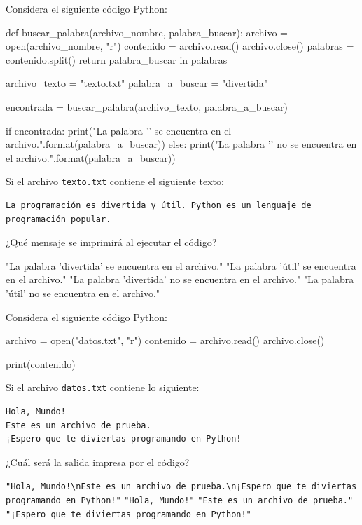 \begin{ejercicio}
Considera el siguiente código Python:

\begin{python}
def buscar_palabra(archivo_nombre, palabra_buscar):
    archivo = open(archivo_nombre, "r")
    contenido = archivo.read()
    archivo.close()
    palabras = contenido.split()
    return palabra_buscar in palabras

archivo_texto = "texto.txt"
palabra_a_buscar = "divertida"

encontrada = buscar_palabra(archivo_texto, palabra_a_buscar)

if encontrada:
    print("La palabra '{}' se encuentra en el archivo.".format(palabra_a_buscar))
else:
    print("La palabra '{}' no se encuentra en el archivo.".format(palabra_a_buscar))
\end{python}

Si el archivo \texttt{texto.txt} contiene el siguiente texto:\\

\begin{Verbatim}[frame=single]
La programación es divertida y útil. Python es un lenguaje de programación popular.
\end{Verbatim}

¿Qué mensaje se imprimirá al ejecutar el código?

\begin{choices}
    \choice "La palabra 'divertida' se encuentra en el archivo."
    \choice "La palabra 'útil' se encuentra en el archivo."
    \choice "La palabra 'divertida' no se encuentra en el archivo."
    \choice "La palabra 'útil' no se encuentra en el archivo."
\end{choices}

\end{ejercicio}

\begin{ejercicio}
Considera el siguiente código Python:

\begin{python}
archivo = open("datos.txt", "r")
contenido = archivo.read()
archivo.close()

print(contenido)
\end{python}

Si el archivo \texttt{datos.txt} contiene lo siguiente:\\

\begin{Verbatim}[frame=single]
Hola, Mundo!
Este es un archivo de prueba.
¡Espero que te diviertas programando en Python!
\end{Verbatim}

¿Cuál será la salida impresa por el código?

\begin{choices}
    \choice \texttt{"Hola, Mundo!\textbackslash nEste es un archivo de prueba.\textbackslash n¡Espero que te diviertas programando en Python!"}
    \choice \texttt{"Hola, Mundo!"}
    \choice \texttt{"Este es un archivo de prueba."}
    \choice \texttt{"¡Espero que te diviertas programando en Python!"}
\end{choices}

\end{ejercicio}

